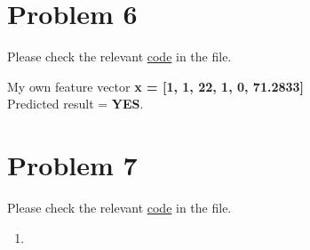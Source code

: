 \documentclass{article}
\begin{document}
\section*{Problem 6}
    \begin{center}
        Please check the relevant \href{https://github.com/z-zijie/2020Fall/blob/master/COMP760/Homework4/code.py}{code} in the file.
    \end{center}
    My own feature vector \textbf{x = [1, 1, 22, 1, 0, 71.2833]}\\
    Predicted result = \textbf{YES}.

    \section*{Problem 7}
    \begin{center}
        Please check the relevant \href{https://github.com/z-zijie/2020Fall/blob/master/COMP760/Homework4/code.py}{code} in the file.
    \end{center}
    \begin{enumerate}
        \item 
    \end{enumerate}
\end{document}
